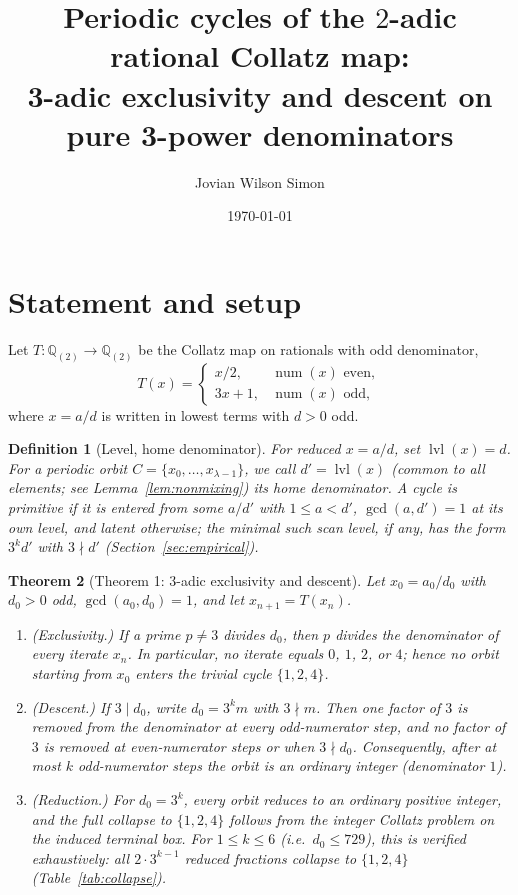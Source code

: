 \documentclass[11pt]{article}
\title{Periodic cycles of the \(2\)-adic rational Collatz map:\\
3-adic exclusivity and descent on pure 3-power denominators}
\author{Jovian Wilson Simon}
\date{\today}
\newtheorem{theorem}{Theorem}[section]
\newtheorem{definition}[theorem]{Definition}
\theoremstyle{remark}
\DeclareMathOperator{\num}{num}
\begin{document}
\maketitle

\section{Statement and setup}

Let \(T\colon \mathbb{Q}_{(2)} \to \mathbb{Q}_{(2)}\) be the Collatz map on
rationals with odd denominator,
\[
  T(x) =
  \begin{cases}
    x/2, & \num(x) \text{ even},\\[2pt]
    3x + 1, & \num(x) \text{ odd},
  \end{cases}
\]
where \(x = a/d\) is written in lowest terms with \(d > 0\) odd.

\begin{definition}[Level, home denominator]
For reduced \(x = a/d\), set \(\operatorname{lvl}(x) = d\). For a periodic orbit
\(C = \{x_0,\dots,x_{\lambda-1}\}\), we call \(d' = \operatorname{lvl}(x)\)
(common to all elements; see Lemma~\ref{lem:nonmixing}) its \emph{home
denominator}. A cycle is \emph{primitive} if it is entered from some
\(a/d'\) with \(1 \le a < d'\), \(\gcd(a,d') = 1\) at its own level, and
\emph{latent} otherwise; the minimal such scan level, if any, has the form
\(3^{k} d'\) with \(3 \nmid d'\) (Section~\ref{sec:empirical}).
\end{definition}

\begin{theorem}[Theorem 1: 3-adic exclusivity and descent]\label{thm:main}
Let \(x_0 = a_0/d_0\) with \(d_0 > 0\) odd, \(\gcd(a_0,d_0) = 1\), and let
\(x_{n+1} = T(x_n)\).
\begin{enumerate}
  \item[(i)] \emph{(Exclusivity.)} If a prime \(p \ne 3\) divides \(d_0\), then
        \(p\) divides the denominator of every iterate \(x_n\). In particular,
        no iterate equals \(0\), \(1\), \(2\), or \(4\); hence no orbit starting
        from \(x_0\) enters the trivial cycle \(\{1,2,4\}\).
  \item[(ii)] \emph{(Descent.)} If \(3 \mid d_0\), write
        \(d_0 = 3^{k} m\) with \(3 \nmid m\). Then one factor of \(3\) is removed
        from the denominator at every odd-numerator step, and no factor of \(3\)
        is removed at even-numerator steps or when \(3 \nmid d_0\). Consequently,
        after at most \(k\) odd-numerator steps the orbit is an ordinary
        integer (denominator \(1\)).
  \item[(iii)] \emph{(Reduction.)} For \(d_0 = 3^{k}\), every orbit reduces to an
        ordinary positive integer, and the full collapse to \(\{1,2,4\}\)
        follows from the integer Collatz problem on the induced terminal box.
        For \(1 \le k \le 6\) (i.e.\ \(d_0 \le 729\)), this is verified
        exhaustively: all \(2 \cdot 3^{k-1}\) reduced fractions collapse
        to \(\{1,2,4\}\) (Table~\ref{tab:collapse}).
\end{enumerate}
\end{theorem}
\end{document}
